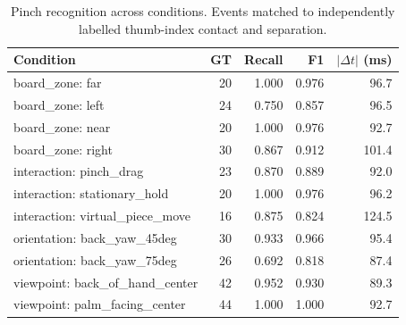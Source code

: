\begin{table}[t]
\centering
\small
\caption{Pinch recognition across conditions. Events matched to independently labelled thumb-index contact and separation.}
\label{tab:pinch_conditions}
\begin{tabular}{lrrrr}
\hline
Condition & GT & Recall & F1 & $|\Delta t|$ (ms) \\
\hline
board\_zone: far & 20 & 1.000 & 0.976 & 96.7 \\
board\_zone: left & 24 & 0.750 & 0.857 & 96.5 \\
board\_zone: near & 20 & 1.000 & 0.976 & 92.7 \\
board\_zone: right & 30 & 0.867 & 0.912 & 101.4 \\
interaction: pinch\_drag & 23 & 0.870 & 0.889 & 92.0 \\
interaction: stationary\_hold & 20 & 1.000 & 0.976 & 96.2 \\
interaction: virtual\_piece\_move & 16 & 0.875 & 0.824 & 124.5 \\
orientation: back\_yaw\_45deg & 30 & 0.933 & 0.966 & 95.4 \\
orientation: back\_yaw\_75deg & 26 & 0.692 & 0.818 & 87.4 \\
viewpoint: back\_of\_hand\_center & 42 & 0.952 & 0.930 & 89.3 \\
viewpoint: palm\_facing\_center & 44 & 1.000 & 1.000 & 92.7 \\
\hline
\end{tabular}
\end{table}
